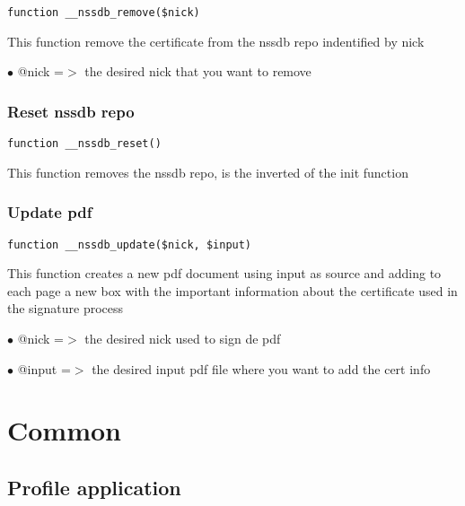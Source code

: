 \documentclass[a4paper]{article}
\begin{document}
\begin{lstlisting}
function __nssdb_remove($nick)
\end{lstlisting}

This function remove the certificate from the nssdb repo indentified by nick

\begin{compactitem}
\item[\color{myblue}$\bullet$] @nick =$>$ the desired nick that you want to remove
\end{compactitem}

\hypertarget{toc18}{}
\subsubsection{Reset nssdb repo}

\begin{lstlisting}
function __nssdb_reset()
\end{lstlisting}

This function removes the nssdb repo, is the inverted of the init function

\hypertarget{toc19}{}
\subsubsection{Update pdf}

\begin{lstlisting}
function __nssdb_update($nick, $input)
\end{lstlisting}

This function creates a new pdf document using input as source and adding to
each page a new box with the important information about the certificate used
in the signature process

\begin{compactitem}
\item[\color{myblue}$\bullet$] @nick  =$>$ the desired nick used to sign de pdf
\item[\color{myblue}$\bullet$] @input =$>$ the desired input pdf file where you want to add the cert info
\end{compactitem}


\hypertarget{toc20}{}
\section{Common}

\hypertarget{toc21}{}
\subsection{Profile application}
\end{document}
